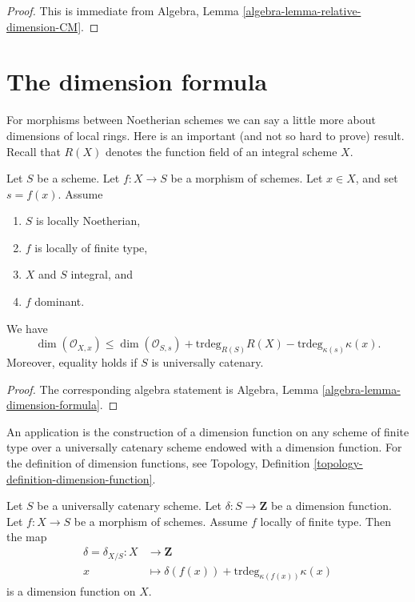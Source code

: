 \begin{proof}
This is immediate from
Algebra,
Lemma
\ref{algebra-lemma-relative-dimension-CM}.
\end{proof}







\section{The dimension formula}
\label{section-dimension-formula}

\noindent
For morphisms between Noetherian schemes we can say a little more
about dimensions of local rings. Here is an important (and not so
hard to prove) result. Recall that $R(X)$ denotes the function field
of an integral scheme $X$.

\begin{lemma}
\label{lemma-dimension-formula}
Let $S$ be a scheme.
Let $f : X \to S$ be a morphism of schemes.
Let $x \in X$, and set $s = f(x)$.
Assume
\begin{enumerate}
\item $S$ is locally Noetherian,
\item $f$ is locally of finite type,
\item $X$ and $S$ integral, and
\item $f$ dominant.
\end{enumerate}
We have
\begin{equation}
\label{equation-dimension-formula}
\dim(\mathcal{O}_{X, x})
\leq
\dim(\mathcal{O}_{S, s}) + \text{trdeg}_{R(S)}R(X)
- \text{trdeg}_{\kappa(s)} \kappa(x).
\end{equation}
Moreover, equality holds if $S$ is universally catenary.
\end{lemma}

\begin{proof}
The corresponding algebra statement is
Algebra, Lemma \ref{algebra-lemma-dimension-formula}.
\end{proof}

\noindent
An application is the construction of a dimension function
on any scheme of finite type over a universally catenary
scheme endowed with a dimension function. For the definition
of dimension functions, see
Topology, Definition \ref{topology-definition-dimension-function}.

\begin{lemma}
\label{lemma-dimension-function-propagates}
Let $S$ be a universally catenary scheme.
Let $\delta : S \to \mathbf{Z}$ be a dimension function.
Let $f : X \to S$ be a morphism of schemes.
Assume $f$ locally of finite type.
Then the map
\begin{align*}
\delta = \delta_{X/S} : X & \longrightarrow \mathbf{Z} \\
x & \longmapsto \delta(f(x)) + \text{trdeg}_{\kappa(f(x))} \kappa(x)
\end{align*}
is a dimension function on $X$.
\end{lemma}

